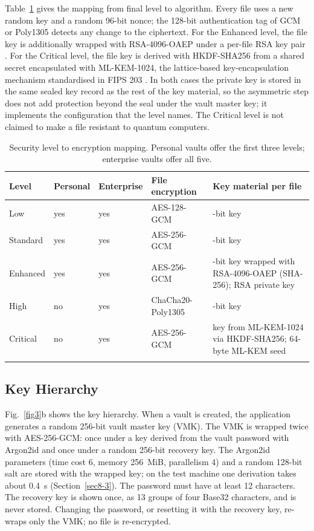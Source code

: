 \documentclass[pdflatex,sn-mathphys-num]{sn-jnl}
\begin{document}
Table~\ref{tab4} gives the mapping from final level to algorithm. Every file uses a new random
key and a random 96-bit nonce; the 128-bit authentication tag of GCM or Poly1305 detects any
change to the ciphertext. For the Enhanced level, the file key is additionally wrapped with
RSA-4096-OAEP under a per-file RSA key pair \cite{rfc8017}. For the Critical level, the file key
is derived with HKDF-SHA256 \cite{rfc5869} from a shared secret encapsulated with ML-KEM-1024, the
lattice-based key-encapsulation mechanism standardised in FIPS 203 \cite{fips203}. In both cases
the private key is stored in the same sealed key record as the rest of the key material, so the
asymmetric step does not add protection beyond the seal under the vault master key; it implements
the configuration that the level names. The Critical level is not claimed to make a file
resistant to quantum computers.

\begin{table}[h]
\caption{Security level to encryption mapping. Personal vaults offer the first three levels;
enterprise vaults offer all five.}\label{tab4}
\begin{tabular}{@{}llll>{\raggedright\arraybackslash}p{4.4cm}@{}}
\toprule
Level & Personal & Enterprise & File encryption & Key material per file \\
\midrule
Low & yes & yes & AES-128-GCM \cite{nist80038d} & 128-bit key \\
Standard & yes & yes & AES-256-GCM & 256-bit key \\
Enhanced & yes & yes & AES-256-GCM & 256-bit key wrapped with RSA-4096-OAEP (SHA-256); RSA
  private key \\
High & no & yes & ChaCha20-Poly1305 \cite{rfc8439} & 256-bit key \\
Critical & no & yes & AES-256-GCM & key from ML-KEM-1024 via HKDF-SHA256; 64-byte ML-KEM
  seed \\
\botrule
\end{tabular}
\end{table}

\subsection{Key Hierarchy}

Fig.~\ref{fig3}b shows the key hierarchy. When a vault is created, the application generates a
random 256-bit vault master key (VMK). The VMK is wrapped twice with AES-256-GCM: once under a key
derived from the vault password with Argon2id \cite{rfc9106} and once under a random 256-bit
recovery key. The Argon2id parameters (time cost 6, memory 256~MiB, parallelism 4) and a random
128-bit salt are stored with the wrapped key; on the test machine one derivation takes about 0.4~s
(Section~\ref{sec8-3}). The password must have at least 12 characters. The recovery key is shown
once, as 13 groups of four Base32 characters, and is never stored. Changing the password, or
resetting it with the recovery key, re-wraps only the VMK; no file is re-encrypted.
\end{document}
